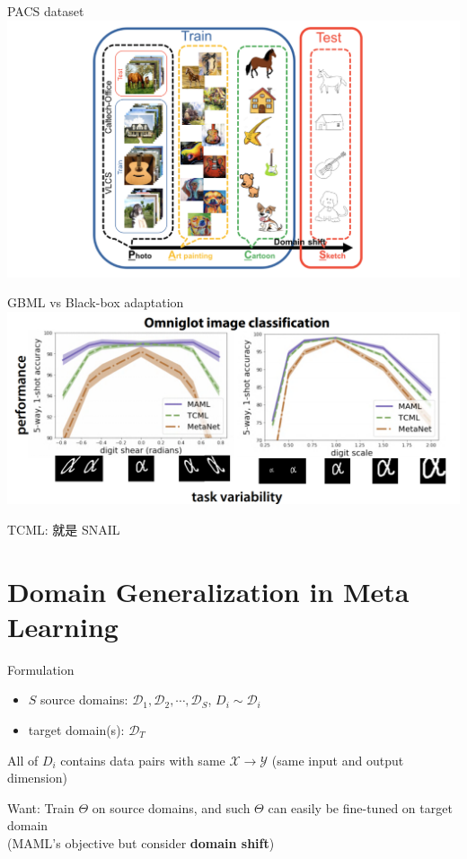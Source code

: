 \documentclass{beamer}
\begin{document}
\begin{frame}[t]{PACS dataset}
  \includegraphics[width=\textwidth]{fig/PACS-dataset.png}
\end{frame}

\begin{frame}[t]{GBML vs Black-box adaptation}
  \includegraphics[width=\textwidth]{fig/gbml-ood.png}

  TCML: 就是 SNAIL
\end{frame}

\section{Domain Generalization in Meta Learning}

\begin{frame}{Formulation}
  \begin{itemize}
    \item $S$ source domains: $\mathcal{D}_1, \mathcal{D}_2, \cdots, \mathcal{D}_S$, $D_i \sim \mathcal{D}_i$
    \item target domain(s): $\mathcal{D}_T$
  \end{itemize}


  All of $D_i$ contains data pairs with same $\mathcal{X} \rightarrow \mathcal{Y}$ (same input and output dimension)

  \vspace{1em}

  Want: Train $\Theta$ on source domains, and such $\Theta$ can easily be fine-tuned on target domain\\
  (MAML's objective but consider \textbf{domain shift})
\end{frame}
\end{document}
